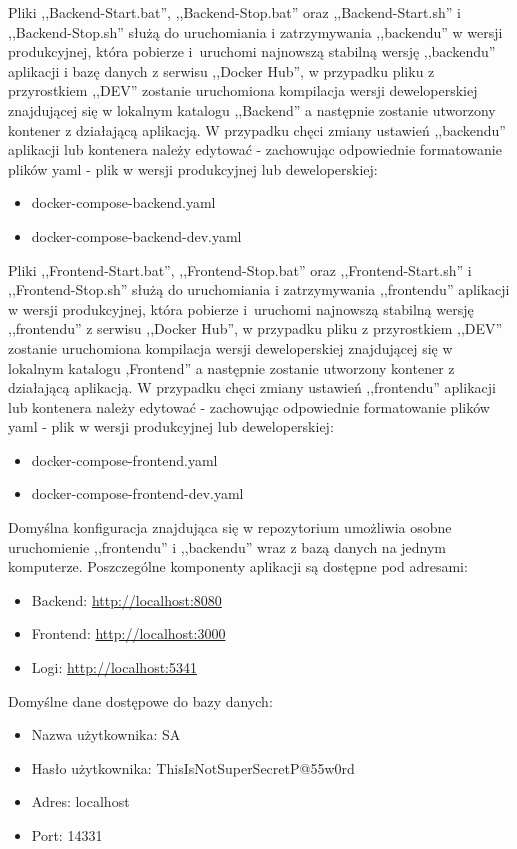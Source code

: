 \documentclass[12pt,a4paper]{article}
\begin{document}
		\indent Pliki ,,Backend-Start.bat'', ,,Backend-Stop.bat'' oraz ,,Backend-Start.sh'' i ,,Backend-Stop.sh'' służą do uruchomiania i zatrzymywania ,,backendu'' w wersji produkcyjnej,
			która pobierze i~uruchomi najnowszą stabilną wersję ,,backendu'' aplikacji i bazę danych z serwisu ,,Docker Hub'', w przypadku pliku z przyrostkiem ,,DEV''
			zostanie uruchomiona kompilacja wersji deweloperskiej znajdującej się w lokalnym katalogu ,,Backend'' a następnie zostanie utworzony kontener z działającą aplikacją.
			W przypadku chęci zmiany ustawień ,,backendu'' aplikacji lub kontenera należy edytować - zachowując odpowiednie formatowanie plików yaml - plik w wersji produkcyjnej
			lub deweloperskiej:
		\begin{itemize}
			\item docker-compose-backend.yaml
			\item docker-compose-backend-dev.yaml		
		\end{itemize}
			\indent Pliki ,,Frontend-Start.bat'', ,,Frontend-Stop.bat'' oraz ,,Frontend-Start.sh'' i ,,Frontend-Stop.sh'' służą do uruchomiania i zatrzymywania ,,frontendu''
			aplikacji w wersji produkcyjnej,
			która pobierze i~uruchomi najnowszą stabilną wersję ,,frontendu'' z serwisu ,,Docker Hub'', w przypadku pliku z przyrostkiem ,,DEV''
			zostanie uruchomiona kompilacja wersji deweloperskiej znajdującej się w lokalnym katalogu ,Frontend'' a następnie zostanie utworzony kontener z działającą aplikacją.
			W przypadku chęci zmiany ustawień ,,frontendu'' aplikacji lub kontenera należy edytować - zachowując odpowiednie formatowanie plików yaml - plik w wersji produkcyjnej
			lub deweloperskiej:
		\begin{itemize}
			\item docker-compose-frontend.yaml
			\item docker-compose-frontend-dev.yaml		
		\end{itemize}
		\indent Domyślna konfiguracja znajdująca się w repozytorium umożliwia osobne uruchomienie ,,frontendu'' i ,,backendu'' wraz z bazą danych na jednym komputerze.
			Poszczególne komponenty aplikacji są dostępne pod adresami:
		\begin{itemize}
			\item Backend: \url{http://localhost:8080}
			\item Frontend: \url{http://localhost:3000}
			\item Logi: \url{http://localhost:5341}
		\end{itemize}
		\indent Domyślne dane dostępowe do bazy danych:
		\begin{itemize}
			\item Nazwa użytkownika: SA
			\item Hasło użytkownika: ThisIsNotSuperSecretP@55w0rd
			\item Adres: localhost
			\item Port: 14331
		\end{itemize}
			
\end{document}
